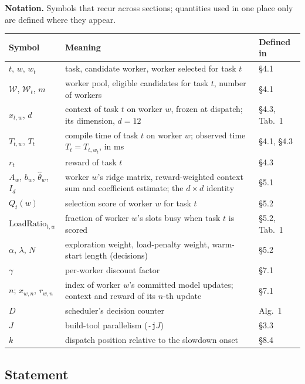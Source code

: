 \documentclass[final,5p,times,twocolumn]{elsarticle}
\begin{document}
\begin{table}[H]
\footnotesize
\setlength{\tabcolsep}{3pt}
\noindent\textbf{Notation.} Symbols that recur across sections; quantities used in one place only are defined where they appear.\\[3pt]
\begin{tabular}{@{}p{2.15cm}p{4.75cm}p{1.45cm}@{}}
\toprule
Symbol & Meaning & Defined in \\
\midrule
$t$, $w$, $w_t$ & task, candidate worker, worker selected for task $t$ & \S4.1 \\
$\mathcal{W}$, $\mathcal{W}_t$, $m$ & worker pool, eligible candidates for task $t$, number of workers & \S4.1 \\
$x_{t,w}$, $d$ & context of task $t$ on worker $w$, frozen at dispatch; its dimension, $d=12$ & \S4.3, Tab.~1 \\
$T_{t,w}$, $T_t$ & compile time of task $t$ on worker $w$; observed time $T_t=T_{t,w_t}$, in ms & \S4.1, \S4.3 \\
$r_t$ & reward of task $t$ & \S4.3 \\
$A_w$, $b_w$, $\hat\theta_w$, $I_d$ & worker $w$'s ridge matrix, reward-weighted context sum and coefficient estimate; the $d\times d$ identity & \S5.1 \\
$Q_t(w)$ & selection score of worker $w$ for task $t$ & \S5.2 \\
$\text{LoadRatio}_{t,w}$ & fraction of worker $w$'s slots busy when task $t$ is scored & \S5.2, Tab.~1 \\
$\alpha$, $\lambda$, $N$ & exploration weight, load-penalty weight, warm-start length (decisions) & \S5.2 \\
$\gamma$ & per-worker discount factor & \S7.1 \\
$n$; $x_{w,n}$, $r_{w,n}$ & index of worker $w$'s committed model updates; context and reward of its $n$-th update & \S7.1 \\
$D$ & scheduler's decision counter & Alg.~1 \\
$J$ & build-tool parallelism (\texttt{-j}$J$) & \S3.3 \\
$k$ & dispatch position relative to the slowdown onset & \S8.4 \\
\bottomrule
\end{tabular}
\end{table}

\subsection{Statement}
\end{document}

